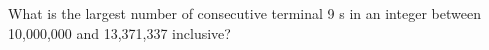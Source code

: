 What is the largest number of consecutive terminal 9 s in an integer between 10,000,000 and 13,371,337 inclusive?
